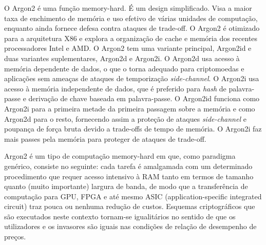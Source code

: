 \documentclass[conference]{IEEEtran}
\begin{document}
O Argon2 é uma função memory-hard. É um design simplificado. Visa a maior taxa de 
enchimento de memória e uso efetivo de várias unidades de computação, 
enquanto ainda fornece defesa contra ataques de trade-off. O Argon2 é otimizado 
para a arquitetura X86 e explora a organização de cache e memória dos recentes 
processadores Intel e AMD. O Argon2 tem uma variante principal, Argon2id e 
duas variantes suplementares, Argon2d e Argon2i. O Argon2d usa acesso à memória 
dependente de dados, o que o torna adequado para criptomoedas e aplicações sem ameaças 
de ataques de temporização \textit{side-channel}. O Argon2i usa acesso à memória 
independente de dados, que é preferido para \textit{hash} de palavra-passe e derivação de 
chave baseada em palavra-passe. O Argon2id funciona como Argon2i para a primeira metade 
da primeira passagem sobre a memória e como Argon2d para o resto, 
fornecendo assim a proteção de ataques \textit{side-channel} e poupança de 
força bruta devido a trade-offs de tempo de memória. O Argon2i faz mais passes pela memória 
para proteger de ataques de trade-off. \cite{rfc9106}

Argon2 é um tipo de computação memory-hard em que, como paradigma genérico, 
consiste no seguinte: cada tarefa é amalgamada com um determinado procedimento que 
requer acesso intensivo à RAM tanto em termos de tamanho quanto (muito importante) 
largura de banda, de modo que a transferência de computação para GPU, FPGA e até mesmo 
ASIC (application-specific integrated circuit) traz pouca ou nenhuma redução de custos. 
Esquemas criptográficos que são executados neste contexto tornam-se igualitários no 
sentido de que os utilizadores e os invasores são iguais nas condições de relação de 
desempenho de preços. \cite{biryukov2016egalitarian}

\end{document}
